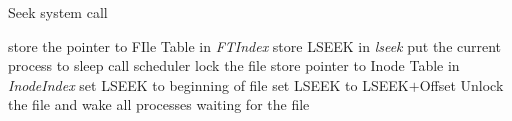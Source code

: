 \documentclass[10pt]{article}
\begin{document}
\begin{algorithm}
\caption{Seek system call}
\begin{algorithmic}
\ENDIF
{}
\ELSE 
    \STATE store the pointer to FIle Table in  \textit{FTIndex}
    \STATE store LSEEK in  \textit{lseek}
\ENDIF
{}
    \STATE put the current process to sleep
    \STATE call scheduler
\ENDWHILE
\STATE lock the file
\STATE store pointer to Inode Table in  \textit{InodeIndex}
\ENDIF
{}
    \STATE set LSEEK to beginning of file
\ELSE
    \STATE set LSEEK to LSEEK$+$Offset
\ENDIF
\STATE Unlock the file and wake all processes waiting for the file
\end{algorithmic}
\end{algorithm}
\vspace{15mm}
\end{document}
